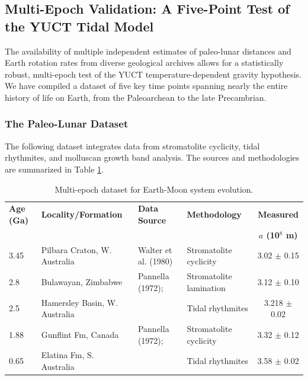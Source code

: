 \documentclass[12pt]{article}
\theoremstyle{remark}
\begin{document}
	\subsection{Multi-Epoch Validation: A Five-Point Test of the YUCT Tidal Model}
	\label{subsec:multi-epoch-validation}
	
	The availability of multiple independent estimates of paleo-lunar distances and Earth rotation rates from diverse geological archives allows for a statistically robust, multi-epoch test of the YUCT temperature-dependent gravity hypothesis. We have compiled a dataset of five key time points spanning nearly the entire history of life on Earth, from the Paleoarchean to the late Precambrian.
	
	\subsubsection{The Paleo-Lunar Dataset}
	\label{subsubsec:paleo-lunar-data}
	
	The following dataset integrates data from stromatolite cyclicity, tidal rhythmites, and molluscan growth band analysis. The sources and methodologies are summarized in Table \ref{tab:paleo-lunar-data}.
	
	\begin{table}[htbp]
		\centering
		\caption{Multi-epoch dataset for Earth-Moon system evolution.}
		\label{tab:paleo-lunar-data}
		\small
		\begin{tabularx}{\textwidth}{l l l X c}
			\toprule
			\textbf{Age (Ga)} & \textbf{Locality/Formation} & \textbf{Data Source} & \textbf{Methodology} & \textbf{Measured } \\
			& & & & \textbf{\(a\) (10\(^8\) m)} \\
			\midrule
			3.45 & Pilbara Craton, W. Australia & Walter et al. (1980) & Stromatolite cyclicity & 3.02 \(\pm\) 0.15 \\
			2.8 & Bulawayan, Zimbabwe & Pannella (1972); \cite{Nature1974} & Stromatolite lamination & 3.12 \(\pm\) 0.10 \\
			2.5 & Hamersley Basin, W. Australia & \cite{Lantink2022} & Tidal rhythmites & 3.218 \(\pm\) 0.02 \\
			1.88 & Gunflint Fm, Canada & Pannella (1972); \cite{Sergeev1998} & Stromatolite cyclicity & 3.32 \(\pm\) 0.12 \\
			0.65 & Elatina Fm, S. Australia & \cite{Williams1989} & Tidal rhythmites & 3.58 \(\pm\) 0.02 \\
			\bottomrule
		\end{tabularx}
	\end{table}
	
\end{document}
